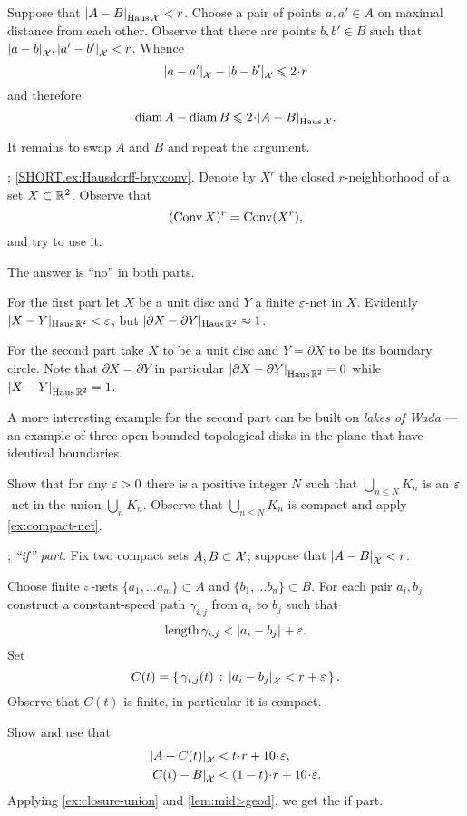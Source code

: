Suppose that $\dist{A}{B}{\Haus\spc{X}}<r$.
Choose a pair of points $a,a'\in A$ on maximal distance from each other.
Observe that there are points $b,b'\in B$ such that 
$\dist{a}{b}{\spc{X}},\dist{a'}{b'}{\spc{X}}<r$.
Whence 
\[\dist{a}{a'}{\spc{X}}-\dist{b}{b'}{\spc{X}}\le 2\cdot r\]
and therefore
\[\diam A-\diam B\le 2\cdot\dist{A}{B}{\Haus\spc{X}}.\]

It remains to swap $A$ and $B$ and repeat the argument.


\parbf{\ref{ex:Hausdorff-bry}}; \ref{SHORT.ex:Hausdorff-bry:conv}.
Denote by $X^r$ the closed $r$-neighborhood of a set $X\z\subset \RR^2$.
Observe  that 
\[(\mathop{\rm Conv}\nolimits X)^r=\mathop{\rm Conv}\nolimits(X^r),\]
and try to use it.

The answer is ``no'' in both parts.

For the first part let $X$ be a unit disc and $Y$ a finite $\varepsilon$-net in $X$.
Evidently $|X-Y|_{\operatorname{\rm Haus}\nolimits\mathbb{R}^2}<\varepsilon$, 
but
$|\partial X-\partial Y|_{\operatorname{\rm Haus}\nolimits\mathbb{R}^2}\approx 1$.

For the second part take $X$ to be a unit disc and $Y=\partial X$ to be its boundary circle.
Note that $\partial X=\partial Y$ in particular $\dist{\partial X}{\partial Y}{\Haus\RR^2}=0$ while $\dist{ X}{ Y}{\Haus\RR^2}=1$.

A more interesting example for the second part can be built on {}\emph{lakes of Wada} --- an example of three open bounded topological disks in the plane that have identical boundaries.

Show that for any $\varepsilon>0$ there is a positive integer $N$ such that $\bigcup_{n\le N} K_n$ is an $\varepsilon$-net in the union $\bigcup_{n} K_n$.
Observe that $\bigcup_{n\le N} K_n$
is compact and apply \ref{ex:compact-net}.

\parbf{\ref{ex:Haus-length}}; \textit{``if'' part.}
Fix two compact sets $A,B\subset \mathcal{X}$;
suppose that $\dist{A}{B}{\spc{X}}<r$.

Choose finite $\varepsilon$-nets $\{a_1,\dots a_m\}\subset A$ and $\{b_1,\dots b_n\}\subset B$.
For each pair $a_i,b_j$ construct a constant-speed path $\gamma_{i,j}$ from $a_i$ to $b_j$ such that 
\[\length \gamma_{i,j}<\dist{a_i}{b_j}{}+\eps.\]
Set 
\[C(t)=\set{\gamma_{i,j}(t)}{\dist{a_i}{b_j}{\spc{X}}<r+\eps}.\]
Observe that $C(t)$ is finite, in particular it is compact.

Show and use that 
\begin{align*}
\dist{A}{C(t)}{\spc{X}}&<t\cdot r+10\cdot\eps,
\\
\dist{C(t)}{B}{\spc{X}}&<(1-t)\cdot r+10\cdot\eps.
\end{align*}
Applying \ref{ex:closure-union} and \ref{lem:mid>geod}, we get the if part.

